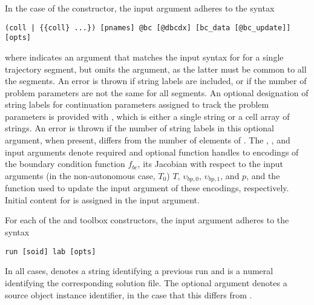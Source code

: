In the case of the  constructor, the  input argument adheres to the syntax
\begin{lstlisting}[language=coco-highlight]
(coll | {{coll} ...}) [pnames] @bc [@dbcdx] [bc_data [@bc_update]] [opts]
\end{lstlisting}
where  indicates an argument that matches the  input syntax for  for a single trajectory segment, but omits the  argument, as the latter must be common to all the segments.  An error is thrown if string labels are included, or if the number of problem parameters are not the same for all segments. An optional designation of string labels for continuation parameters assigned to track the problem parameters is provided with , which is either a single string or a cell array of strings. An error is thrown if the number of string labels in this optional argument, when present, differs from the number of elements of . The , , and  input arguments denote required and optional function handles to encodings of the boundary condition function $f_{bc}$, its Jacobian with respect to the input arguments (in the non-autonomous case, $T_0$) $T$, $\upsilon_{bp,0}$, $\upsilon_{bp,1}$, and $p$, and the function used to update the  input argument of these encodings, respectively. Initial content for  is assigned in the  input argument.

For each of the  and  toolbox constructors, the  input argument adheres to the syntax
\begin{lstlisting}[language=coco-highlight]
run [soid] lab [opts]
\end{lstlisting}
In all cases,  denotes a string identifying a previous run and  is a numeral identifying the corresponding solution file. The optional argument  denotes a source object instance identifier, in the case that this differs from .

